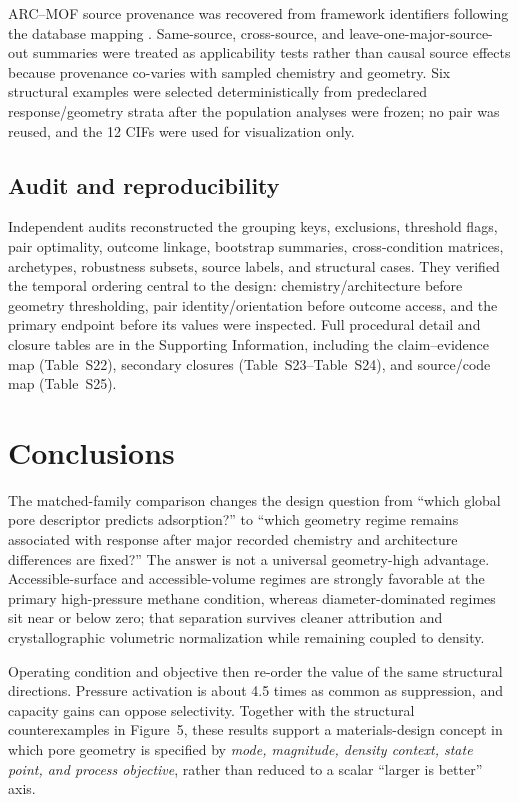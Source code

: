 \documentclass[11pt,a4paper]{article}
\newcommand{\SItab}[1]{Table~S#1}
\begin{document}
ARC--MOF source provenance was recovered from framework identifiers following the
database mapping \cite{burner2023arcmof}. Same-source, cross-source, and
leave-one-major-source-out summaries were treated as applicability tests rather
than causal source effects because provenance co-varies with sampled chemistry and
geometry. Six structural examples were selected deterministically from predeclared
response/geometry strata after the population analyses were frozen; no pair was
reused, and the 12 CIFs were used for visualization only.

\subsection{Audit and reproducibility}

Independent audits reconstructed the grouping keys, exclusions, threshold flags,
pair optimality, outcome linkage, bootstrap summaries, cross-condition matrices,
archetypes, robustness subsets, source labels, and structural cases. They verified
the temporal ordering central to the design: chemistry/architecture before geometry
thresholding, pair identity/orientation before outcome access, and the primary
endpoint before its values were inspected. Full procedural detail and closure
tables are in the Supporting Information, including the claim--evidence map
(\SItab{22}), secondary closures (\SItab{23}--\SItab{24}), and source/code map
(\SItab{25}).

\section{Conclusions}

The matched-family comparison changes the design question from ``which global pore
descriptor predicts adsorption?'' to ``which geometry regime remains associated
with response after major recorded chemistry and architecture differences are
fixed?'' The answer is not a universal geometry-high advantage. Accessible-surface
and accessible-volume regimes are strongly favorable at the primary high-pressure
methane condition, whereas diameter-dominated regimes sit near or below zero; that
separation survives cleaner attribution and crystallographic volumetric
normalization while remaining coupled to density.

Operating condition and objective then re-order the value of the same structural
directions. Pressure activation is about 4.5 times as common as suppression, and
capacity gains can oppose selectivity. Together with the structural counterexamples
in Figure~5, these results support a materials-design concept in which pore geometry
is specified by \emph{mode, magnitude, density context, state point, and process
objective}, rather than reduced to a scalar ``larger is better'' axis.
\end{document}
